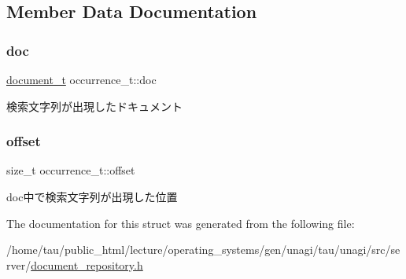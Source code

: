 \subsection{Member Data Documentation}
\mbox{\label{structoccurrence__t_afcff1f11f483a42c75b8a4220f395842}} 
\subsubsection{\texorpdfstring{doc}{doc}}
{\footnotesize\ttfamily \hyperlink{structdocument__t}{document\+\_\+t} occurrence\+\_\+t\+::doc}

検索文字列が出現したドキュメント \mbox{\label{structoccurrence__t_a647734d7e58f6dd1c266bd4824285528}} 
\subsubsection{\texorpdfstring{offset}{offset}}
{\footnotesize\ttfamily size\+\_\+t occurrence\+\_\+t\+::offset}

doc中で検索文字列が出現した位置 

The documentation for this struct was generated from the following file\+:\begin{DoxyCompactItemize}
\item 
/home/tau/public\+\_\+html/lecture/operating\+\_\+systems/gen/unagi/tau/unagi/src/server/\hyperlink{document__repository_8h}{document\+\_\+repository.\+h}\end{DoxyCompactItemize}
